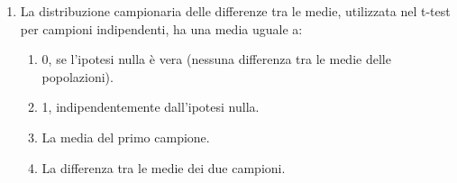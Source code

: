 \documentclass[12pt, a4paper]{article}
\begin{document}
\begin{enumerate}[resume]
    \item La distribuzione campionaria delle differenze tra le medie, utilizzata nel t-test per campioni indipendenti, ha una media uguale a:
    \begin{enumerate}
        \item 0, se l'ipotesi nulla è vera (nessuna differenza tra le medie delle popolazioni).
        \item 1, indipendentemente dall'ipotesi nulla.
        \item La media del primo campione.
        \item La differenza tra le medie dei due campioni.
    \end{enumerate}
    \vspace{0.3cm}
\end{enumerate}

\end{document}
